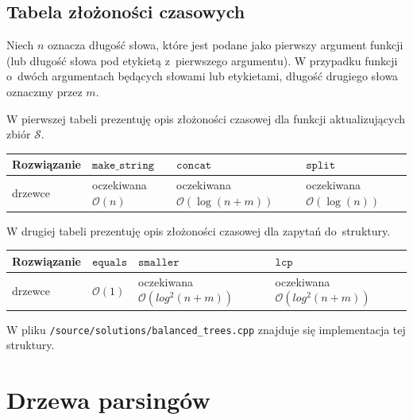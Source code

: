 \documentclass[declaration,shortabstract]{iithesis}
\theoremstyle{definition} \newtheorem{definition}{Definicja}[chapter]
\theoremstyle{remark} \newtheorem{remark}[definition]{Obserwacja}
\theoremstyle{plain} \newtheorem{theorem}[definition]{Twierdzenie}
\theoremstyle{remark} \newtheorem{example}{Przykład}[definition]
\theoremstyle{plain} \newtheorem{lemma}[definition]{Lemat}
\begin{document}
\subsection{Tabela złożoności czasowych}

Niech $n$ oznacza długość słowa, które jest podane jako pierwszy argument funkcji (lub długość słowa pod etykietą z~pierwszego argumentu). W przypadku funkcji o~dwóch argumentach będących słowami lub etykietami, długość drugiego słowa oznaczmy przez $m$.

W pierwszej tabeli prezentuję opis złożoności czasowej dla funkcji aktualizujących zbiór $\mathcal{S}$.

\begin{center}
    \begin{tabular}{ | m{3cm} | >{\centering\arraybackslash}m{3cm} | >{\centering\arraybackslash}m{3cm} | >{\centering\arraybackslash}m{3cm} | }
        \hline 
        Rozwiązanie & $\texttt{make\_string}$ & $\texttt{concat}$ & $\texttt{split}$ \\
        \hline
        drzewce & oczekiwana $\mathcal{O}(n)$ & oczekiwana $\mathcal{O}(\log(n + m))$ & oczekiwana $\mathcal{O}(\log(n))$ \\
        \hline
    \end{tabular}
\end{center}

W drugiej tabeli prezentuję opis złożoności czasowej dla zapytań do~struktury.

\begin{center}
    \begin{tabular}{ | m{3cm} | >{\centering\arraybackslash}m{3cm} | >{\centering\arraybackslash}m{3cm} | >{\centering\arraybackslash}m{3cm} | }
        \hline 
        Rozwiązanie & $\texttt{equals}$ & $\texttt{smaller}$ & $\texttt{lcp}$ \\
        \hline
        drzewce & $\mathcal{O}(1)$ & oczekiwana $\mathcal{O}(log^2(n + m))$ & oczekiwana $\mathcal{O}(log^2(n + m))$ \\
        \hline
    \end{tabular}
\end{center}

W pliku \texttt{/source/solutions/balanced\_trees.cpp} znajduje się implementacja tej struktury.

\section{Drzewa parsingów}
\end{document}
